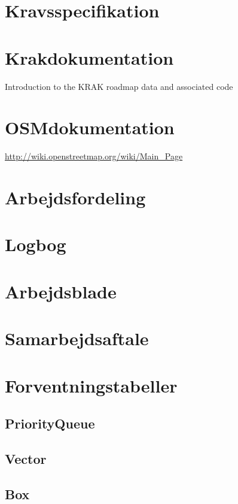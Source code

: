\section{Kravsspecifikation}
\label{sec:Kravsspecifikation}


\label{sec:uml}


\section{Krakdokumentation}
\label{sec:Krakdokumentation}
Introduction to the KRAK roadmap data and associated code



\section{OSMdokumentation}
\label{sec:OSM-dokumentation}
\url{http://wiki.openstreetmap.org/wiki/Main_Page}

\section{Arbejdsfordeling}
\label{sec:arbejdsfordeling}


\section{Logbog}
\label{sec:logbog}


\section{Arbejdsblade}
\label{sec:arbejdsblade}


\section{Samarbejdsaftale}
\label{sec:Samarbejdsaftale}


\label{sec:pq}


\section{Forventningstabeller}
\label{sec:forventningstabeller}
\subsection{PriorityQueue}

\clearpage

\clearpage
\subsection{Vector}

\clearpage
\subsection{Box}

\clearpage